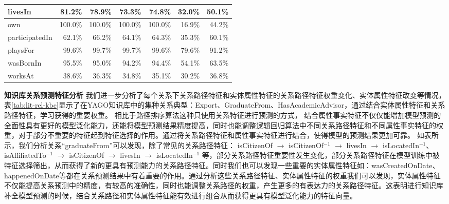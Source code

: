 \begin{table}[H]
\begin{tabular}{|l|r|r|r|r|r|r|}
    \hline
    livesIn & 81.2\% & 78.9\% & 73.3\% & 74.8\% & 32.0\% & 50.1\% \bigstrut\\
    \hline
    own   & 100.0\% & 100.0\% & 100.0\% & 100.0\% & 16.9\% & 44.2\% \bigstrut\\
    \hline
    participatedIn & 62.1\% & 66.2\% & 64.1\% & 64.3\% & 35.3\% & 60.1\% \bigstrut\\
    \hline
    playsFor & 99.6\% & 99.7\% & 99.7\% & 99.6\% & 79.6\% & 91.2\% \bigstrut\\
    \hline
    wasBornIn & 95.5\% & 95.0\% & 94.2\% & 94.4\% & 54.1\% & 63.5\% \bigstrut\\
    \hline
    worksAt & 38.6\% & 36.3\% & 34.8\% & 35.1\% & 30.2\% & 36.8\% \bigstrut\\
    \hline
    \end{tabular}%
  \label{tab:lit-rel-map}%
\end{table}%



\textbf{知识库关系预测特征分析}
我们进一步分析了每个关系下关系路径特征和实体属性特征的关系路径特征权重变化、实体属性特征改变等情况，
表\ref{tab:lit-rel-kbc}显示了在YAGO知识库中的集种关系典型：Export、GraduateFrom、HasAcademicAdvisor，通过结合实体属性特征和关系路径特征，学习获得的重要权重。
相比于路径排序算法这种只使用关系特征进行预测的方式，
结合属性事实特征不仅仅能增加模型预测的全面性具有更好的模型泛化能力，还能将模型预测结果精度提高，同时也能调整逻辑回归算法中不同关系路径特征和不同属性事实特征的权重，对于部分不重要的特征起到特征选择的作用。通过将关系路径特征和属性事实特征进行结合，使得模型的预测结果更加可靠。
如表所示，我们分析关系“graduateFrom”可以发现，除了常见的关系路径特征：
isCitizenOf $\to$ isCitizenOf$^{-1}$ $\to$ livesIn $\to$ isLocatedIn$^{-1}$、
isAffiliatedTo$^{-1}$ $\to$ isCitizenOf $\to$ livesIn $\to$ isLocatedIn$^{-1}$
等，部分关系路径特征重要性发生变化，部分关系路径特征在模型训练中被特征选择筛出，从而获得了新的更具有预测能力的关系路径特征。同时我们也可以发现一些重要的实体属性特征如：wasCreatedOnDate、happenedOnDate等都在关系预测结果中有着重要的作用。通过分析这些关系路径特征、实体属性特征的权重我们可以发现，实体属性特征不仅能提高关系预测中的精度，有较高的准确性，同时也能调整关系路径的权重，产生更多的有表达力的关系路径特征。这表明进行知识库补全模型预测的时候，结合关系路径和实体属性特征能有效进行组合从而获得更具有模型泛化能力的特征向量。


